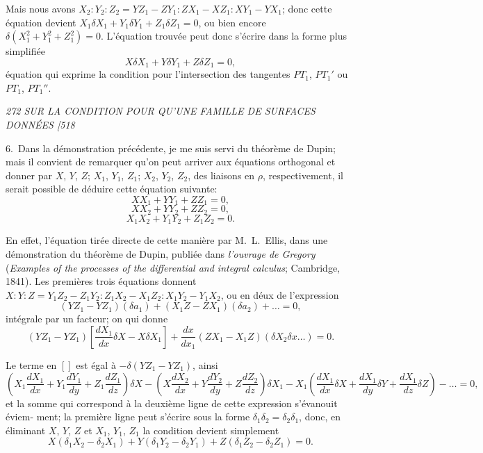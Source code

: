 \documentclass[11pt,a4paper]{book}
\begin{document}
Mais nous avons $X_2 : Y_2 : Z_2 = YZ_1 - ZY_1 : ZX_1 - XZ_1 : XY_1 - YX_1$; donc cette
\'equation devient $X_1\delta X_1 + Y_1\delta Y_1 + Z_1\delta Z_1 = 0$, ou bien encore $\delta(X_1^2 + Y_1^2 + Z_1^2) = 0$.
L'\'equation trouv\'ee peut donc s'\'ecrire dans la forme plus simplifi\'ee
\[
X\delta X_1 + Y\delta Y_1 + Z\delta Z_1 = 0,
\]
\'equation qui exprime la condition pour l'intersection des tangentes $PT_1$, $PT_1'$ ou $PT_1$, $PT_1''$.

\clearpage

\noindent\textit{272 \hfill SUR LA CONDITION POUR QU'UNE FAMILLE DE SURFACES DONN\'EES \hfill [518}

\medskip

6.~Dans la d\'emonstration pr\'ec\'edente, je me suis servi du th\'eor\`eme de Dupin;
mais il convient de remarquer qu'on peut arriver aux \'equations orthogonal et donner par
$X$, $Y$, $Z$; $X_1$, $Y_1$, $Z_1$; $X_2$, $Y_2$, $Z_2$, des liaisons en $\rho$, respectivement, il serait
possible de d\'eduire cette \'equation suivante:
\[
X X_1 + Y Y_1 + Z Z_1 = 0,
\]
\[
X X_2 + Y Y_2 + Z Z_2 = 0,
\]
\[
X_1 X_2 + Y_1 Y_2 + Z_1 Z_2 = 0.
\]

En effet, l'\'equation tir\'ee directe de cette mani\`ere par M.~L.~Ellis, dans une
d\'emonstration du th\'eor\`eme de Dupin, publi\'ee dans \textit{l'ouvrage de Gregory} (\textit{Examples of
the processes of the differential and integral calculus}; Cambridge, 1841). Les premi\`eres
trois \'equations donnent $X : Y : Z = Y_1 Z_2 - Z_1 Y_2 : Z_1 X_2 - X_1 Z_2 : X_1 Y_2 - Y_1 X_2$, ou en d\'eux
de l'expression
\[
(YZ_1 - YZ_1)(\delta a_1) + (X_1 Z - ZX_1)(\delta a_2) + \ldots = 0,
\]
int\'egrale par un facteur; on qui donne
\[
(YZ_1 - YZ_1)\left[\frac{dX_1}{dx} \delta X - X\delta X_1\right] + \frac{dx}{dx_1}(ZX_1 - X_1Z)(\delta X_2 \delta x \ldots) = 0.
\]

Le terme en $[ ]$ est \'egal \`a $-\delta(YZ_1 - YZ_1)$, ainsi
\[
\left(X_1 \frac{d X_1}{dx} + Y_1 \frac{d Y_1}{dy} + Z_1 \frac{d Z_1}{dz}\right)\delta X - \left(X \frac{d X_2}{dx} + Y \frac{d Y_2}{dy} + Z \frac{d Z_2}{dz}\right) \delta X_1 - X_1 \left(\frac{d X_1}{dx} \delta X + \frac{d X_1}{dy}\delta Y + \frac{d X_1}{dz}\delta Z\right) - \ldots = 0,
\]
et la somme qui correspond \`a la deuxi\`eme ligne de cette expression s'\'evanouit \'eviem-
ment; la premi\`ere ligne peut s'\'ecrire sous la forme $\delta_{1}\delta_{2} = \delta_{2}\delta_{1}$, donc, en \'eliminant
$X$, $Y$, $Z$ et $X_1$, $Y_1$, $Z_1$ la condition devient simplement
\[
X(\delta_1 X_2 - \delta_2 X_1) + Y(\delta_1 Y_2 - \delta_2 Y_1) + Z(\delta_1 Z_2 - \delta_2 Z_1) = 0.
\]
\end{document}
